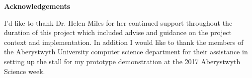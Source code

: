 \thispagestyle{empty}

\begin{center}
    {\LARGE\bf Acknowledgements}
\end{center}

I'd like to thank Dr. Helen Miles for her continued support throughout the duration of this project which included advise and guidance on the project context and implementation. In addition I would like to thank the members of the Aberystwyth University computer science department for their assistance in setting up the stall for my prototype demonstration at the 2017 Aberystwyth Science week. 
